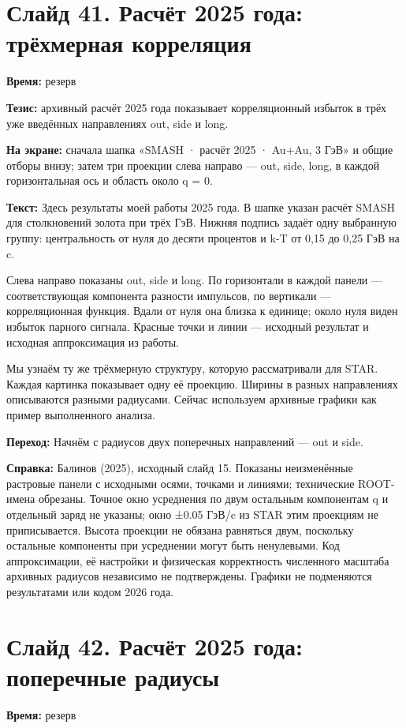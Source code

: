 \documentclass[11pt,a4paper]{article}
\begin{document}
\clearpage
\section*{Слайд 41. Расчёт 2025 года: трёхмерная корреляция}
\textbf{Время:} резерв

\textbf{Тезис:} архивный расчёт 2025 года показывает корреляционный избыток в трёх уже введённых направлениях out, side и long.

\textbf{На экране:} сначала шапка «SMASH · расчёт 2025 · Au+Au, 3 ГэВ» и общие отборы внизу; затем три проекции слева направо — out, side, long, в каждой горизонтальная ось и область около q = 0.

\textbf{Текст:} Здесь результаты моей работы 2025 года. В шапке указан расчёт SMASH для столкновений золота при трёх ГэВ. Нижняя подпись задаёт одну выбранную группу: центральность от нуля до десяти процентов и k-T от 0,15 до 0,25 ГэВ на c.

Слева направо показаны out, side и long. По горизонтали в каждой панели — соответствующая компонента разности импульсов, по вертикали — корреляционная функция. Вдали от нуля она близка к единице; около нуля виден избыток парного сигнала. Красные точки и линии — исходный результат и исходная аппроксимация из работы.

Мы узнаём ту же трёхмерную структуру, которую рассматривали для STAR. Каждая картинка показывает одну её проекцию. Ширины в разных направлениях описываются разными радиусами. Сейчас используем архивные графики как пример выполненного анализа.

\textbf{Переход:} Начнём с радиусов двух поперечных направлений — out и side.

\textbf{Справка:} Балинов (2025), исходный слайд 15. Показаны неизменённые растровые панели с исходными осями, точками и линиями; технические ROOT-имена обрезаны. Точное окно усреднения по двум остальным компонентам q и отдельный заряд не указаны; окно ±0.05 ГэВ/c из STAR этим проекциям не приписывается. Высота проекции не обязана равняться двум, поскольку остальные компоненты при усреднении могут быть ненулевыми. Код аппроксимации, её настройки и физическая корректность численного масштаба архивных радиусов независимо не подтверждены. Графики не подменяются результатами или кодом 2026 года.

\clearpage
\section*{Слайд 42. Расчёт 2025 года: поперечные радиусы}
\textbf{Время:} резерв
\end{document}
